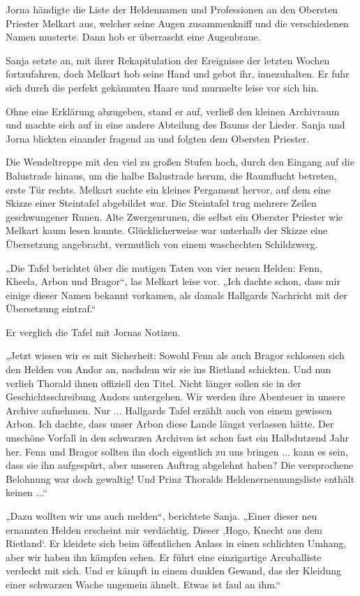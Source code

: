 Jorna händigte die Liste der Heldennamen und Professionen an den Obersten Priester Melkart aus, welcher seine Augen zusammenkniff und die verschiedenen Namen musterte. Dann hob er überrascht eine Augenbraue.

Sanja setzte an, mit ihrer Rekapitulation der Ereignisse der letzten Wochen fortzufahren, doch Melkart hob seine Hand und gebot ihr, innezuhalten. Er fuhr sich durch die perfekt gekämmten Haare und murmelte leise vor sich hin.

Ohne eine Erklärung abzugeben, stand er auf, verließ den kleinen Archivraum und machte sich auf in eine andere Abteilung des Baums der Lieder. Sanja und Jorna blickten einander fragend an und folgten dem Obersten Priester.

Die Wendeltreppe mit den viel zu großen Stufen hoch, durch den Eingang auf die Balustrade hinaus, um die halbe Balustrade herum, die Raumflucht betreten, erste Tür rechts. Melkart suchte ein kleines Pergament hervor, auf dem eine Skizze einer Steintafel abgebildet war. Die Steintafel trug mehrere Zeilen geschwungener Runen. Alte Zwergenrunen, die selbst ein Oberster Priester wie Melkart kaum lesen konnte. Glücklicherweise war unterhalb der Skizze eine Übersetzung angebracht, vermutlich von einem waschechten Schildzwerg.

„Die Tafel berichtet über die mutigen Taten von vier neuen Helden: Fenn, Kheela, Arbon und Bragor“, las Melkart leise vor. „Ich dachte schon, dass mir einige dieser Namen bekannt vorkamen, als damals Hallgards Nachricht mit der Übersetzung eintraf.“

Er verglich die Tafel mit Jornas Notizen.

„Jetzt wissen wir es mit Sicherheit: Sowohl Fenn als auch Bragor schlossen sich den Helden von Andor an, nachdem wir sie ins Rietland schickten. Und nun verlieh Thorald ihnen offiziell den Titel. Nicht länger sollen sie in der Geschichtsschreibung Andors untergehen. Wir werden ihre Abenteuer in unsere Archive aufnehmen. Nur ... Hallgards Tafel erzählt auch von einem gewissen Arbon. Ich dachte, dass unser Arbon diese Lande längst verlassen hätte. Der unschöne Vorfall in den schwarzen Archiven ist schon fast ein Halbdutzend Jahr her. Fenn und Bragor sollten ihn doch eigentlich zu uns bringen ... kann es sein, dass sie ihn aufgespürt, aber unseren Auftrag abgelehnt haben? Die versprochene Belohnung war doch gewaltig! Und Prinz Thoralds Heldenernennungsliste enthält keinen ...“

„Dazu wollten wir uns auch melden“, berichtete Sanja. „Einer dieser neu ernannten Helden erscheint mir verdächtig. Dieser ‚Hogo, Knecht aus dem Rietland‘. Er kleidete sich beim öffentlichen Anlass in einen schlichten Umhang, aber wir haben ihn kämpfen sehen. Er führt eine einzigartige Arcuballiste verdeckt mit sich. Und er kämpft in einem dunklen Gewand, das der Kleidung einer schwarzen Wache ungemein ähnelt. Etwas ist faul an ihm.“

